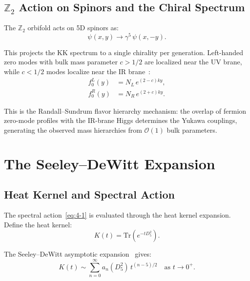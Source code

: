 \subsection{\texorpdfstring{$\mathbb{Z}_2$}{Z2} Action on Spinors and the Chiral Spectrum}
\label{sec:4-z2-spinors}

The $\mathbb{Z}_2$ orbifold acts on 5D spinors as:
\begin{equation}
  \psi(x, y) \to \gamma^5\, \psi(x, -y).
  \label{eq:4-13}
\end{equation}

This projects the KK spectrum to a single chirality per generation. Left-handed zero modes with bulk mass parameter $c > 1/2$ are localized near the UV brane, while $c < 1/2$ modes localize near the IR brane~\cite{ch4:GherghettaPomarol2000}:
\begin{subequations}\label{eq:4-14}
\begin{align}
  f_0^L(y) &= N_L\, e^{(2-c)ky}, \label{eq:4-14a}\\
  f_0^R(y) &= N_R\, e^{(2+c)ky}. \label{eq:4-14b}
\end{align}
\end{subequations}

This is the Randall--Sundrum flavor hierarchy mechanism: the overlap of fermion zero-mode profiles with the IR-brane Higgs determines the Yukawa couplings, generating the observed mass hierarchies from $\mathcal{O}(1)$ bulk parameters.


\section{The Seeley--DeWitt Expansion}
\label{sec:4-seeley-dewitt}

\subsection{Heat Kernel and Spectral Action}
\label{sec:4-heat-kernel}

The spectral action~\eqref{eq:4-1} is evaluated through the heat kernel expansion. Define the heat kernel:
\begin{equation}
  K(t) = \mathrm{Tr}\!\left(e^{-t D_5^2}\right).
  \label{eq:4-15}
\end{equation}

The Seeley--DeWitt asymptotic expansion~\cite{ch4:Gilkey1984,ch4:Gilkey1975} gives:
\begin{equation}
  K(t) \sim \sum_{n=0}^{\infty} a_n(D_5^2)\, t^{(n-5)/2}
  \quad \text{as } t \to 0^+.
  \label{eq:4-16}
\end{equation}

